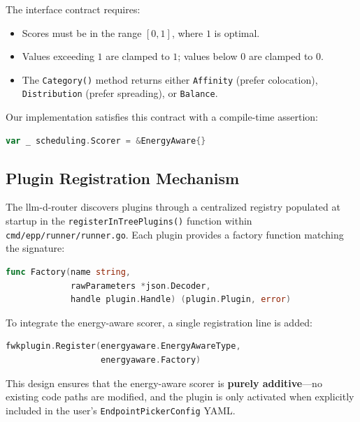 The interface contract requires:
\begin{itemize}
    \item Scores must be in the range $[0, 1]$, where $1$ is optimal.
    \item Values exceeding $1$ are clamped to $1$; values below $0$ are clamped to $0$.
    \item The \texttt{Category()} method returns either \texttt{Affinity} (prefer colocation), \texttt{Distribution} (prefer spreading), or \texttt{Balance}.
\end{itemize}

Our implementation satisfies this contract with a compile-time assertion:

\begin{lstlisting}[language=Go, caption={Compile-time interface conformance assertion}, label={lst:compile-assert}]
var _ scheduling.Scorer = &EnergyAware{}
\end{lstlisting}

\subsection{Plugin Registration Mechanism}
\label{subsec:plugin-registration}

The llm-d-router discovers plugins through a centralized registry populated at startup in the \texttt{registerInTreePlugins()} function within \texttt{cmd/epp/runner/runner.go}. Each plugin provides a factory function matching the signature:

\begin{lstlisting}[language=Go, caption={Plugin factory function signature}, label={lst:factory-sig}]
func Factory(name string,
             rawParameters *json.Decoder,
             handle plugin.Handle) (plugin.Plugin, error)
\end{lstlisting}

To integrate the energy-aware scorer, a single registration line is added:

\begin{lstlisting}[language=Go, caption={One-line plugin registration in \texttt{runner.go}}, label={lst:registration}]
fwkplugin.Register(energyaware.EnergyAwareType,
                   energyaware.Factory)
\end{lstlisting}

This design ensures that the energy-aware scorer is \textbf{purely additive}---no existing code paths are modified, and the plugin is only activated when explicitly included in the user's \texttt{EndpointPickerConfig} YAML.

